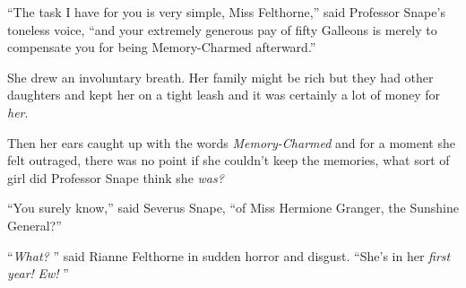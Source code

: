 ``The task I have for you is very simple, Miss Felthorne,'' said
Professor Snape's toneless voice, ``and your extremely generous pay of
fifty Galleons is merely to compensate you for being Memory-Charmed
afterward.''

She drew an involuntary breath. Her family might be rich but they had
other daughters and kept her on a tight leash and it was certainly a lot
of money for \emph{her}.

Then her ears caught up with the words \emph{Memory-Charmed} and for a
moment she felt outraged, there was no point if she couldn't keep the
memories, what sort of girl did Professor Snape think she \emph{was?}

``You surely know,'' said Severus Snape, ``of Miss Hermione Granger, the
Sunshine General?''

``\emph{What?} '' said Rianne Felthorne in sudden horror and disgust.
``She's in her \emph{first year!} \emph{Ew!} ''
